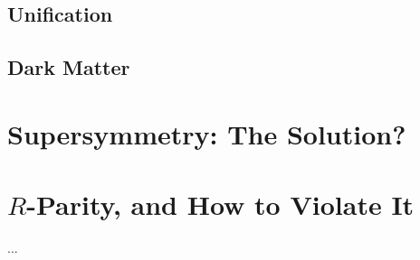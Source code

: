 \subsection{Unification}

\subsection{Dark Matter}

\section{Supersymmetry: The Solution?}

\section{$R$-Parity, and How to Violate It}

		 ...